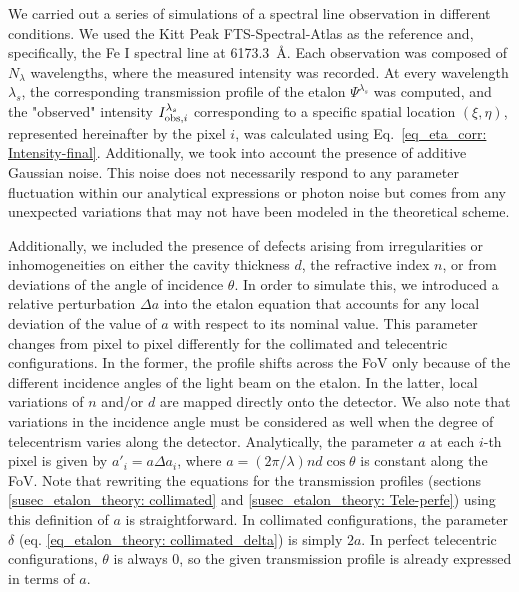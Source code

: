 We carried out a series of simulations of a spectral line observation in different conditions. We used the Kitt Peak FTS-Spectral-Atlas as the reference \citep{fts} and, specifically, the Fe I spectral line at 6173.3~\r{A}. Each observation was composed of $N_\lambda$ wavelengths, where the measured intensity was recorded. At every wavelength $\lambda_s$, the corresponding transmission profile of the etalon $\Psi^{\lambda_s}$ was computed, and the "observed" intensity $I ^{\lambda _ s} _ {{\rm obs}, i}$ corresponding to a specific spatial location $(\xi, \eta)$, represented hereinafter by the pixel $i$, was calculated using Eq.~\eqref{eq_eta_corr: Intensity-final}. Additionally, we took into account the presence of additive Gaussian noise. This noise does not necessarily respond to any parameter fluctuation within our analytical expressions or photon noise but comes from any unexpected variations that may not have been modeled in the theoretical scheme.

Additionally, we included the presence of defects arising from irregularities or inhomogeneities on either the cavity thickness $d$, the refractive index $n$, or from deviations of the angle of incidence $\theta$. In order to simulate this, we introduced a relative perturbation $\Delta a$ into the etalon equation that accounts for any local deviation of the value of $a$ with respect to its nominal value. This parameter changes from pixel to pixel differently for the collimated and telecentric configurations. In the former, the profile shifts across the FoV only because of the different incidence angles of the light beam on the etalon. In the latter, local variations of $n$ and/or $d$ are mapped directly onto the detector. We also note that variations in the incidence angle must be considered as well when the degree of telecentrism varies along the detector. Analytically, the parameter $a$ at each $i$-th pixel is given by $a' _ i = a \Delta a _ i$, where $a = (2\pi/\lambda) n d\cos\theta$ is constant along the FoV. Note that rewriting the equations for the transmission profiles (sections \ref{susec_etalon_theory: collimated} and \ref{susec_etalon_theory: Tele-perfe}) using this definition of $a$ is straightforward. In collimated configurations, the parameter $\delta$ (eq. \eqref{eq_etalon_theory: collimated_delta}) is simply $2a$. In perfect telecentric configurations, $\theta$ is always 0, so the given transmission profile is already expressed in terms of $a$.   


